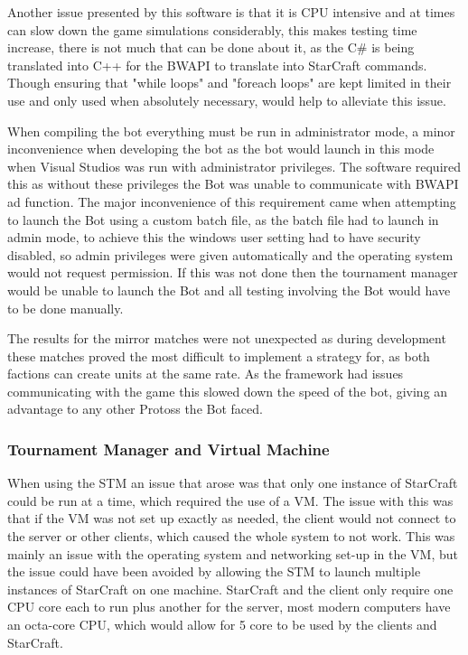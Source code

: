 \documentclass[journal]{IEEEtran}
\begin{document}
	Another issue presented by this software is that it is CPU intensive and at times can slow down the game simulations considerably, this makes testing time increase, there is not much that can be done about it, as the C\# is being translated into C++ for the BWAPI to translate into StarCraft commands. Though ensuring that "while loops" and "foreach loops" are kept limited in their use and only used when absolutely necessary, would help to alleviate this issue.
	
	When compiling the bot everything must be run in administrator mode, a minor inconvenience when developing the bot as the bot would launch in this mode when Visual Studios was run with administrator privileges. The software required this as without these privileges the Bot was unable to communicate with BWAPI ad function. The major inconvenience of this requirement came when attempting to launch the Bot using a custom batch file, as the batch file had to launch in admin mode, to achieve this the windows user setting had to have security disabled, so admin privileges were given automatically and the operating system would not request permission. If this was not done then the tournament manager would be unable to launch the Bot and all testing involving the Bot would have to be done manually.
	
	The results for the mirror matches were not unexpected as during development these matches proved the most difficult to implement a strategy for, as both factions can create units at the same rate. As the framework had issues communicating with the game this slowed down the speed of the bot, giving an advantage to any other Protoss the Bot faced. 
	\newline
	\subsubsection{Tournament Manager and Virtual Machine}
	When using the STM an issue that arose was that only one instance of StarCraft could be run at a time, which required the use of a VM. The issue with this was that if the VM was not set up exactly as needed, the client would not connect to the server or other clients, which caused the whole system to not work. This was mainly an issue with the operating system and networking set-up in the VM, but the issue could have been avoided by allowing the STM to launch multiple instances of StarCraft on one machine. StarCraft and the client only require one CPU core each to run plus another for the server, most modern computers have an octa-core CPU, which would allow for 5 core to be used by the clients and StarCraft. 
	
\end{document}
